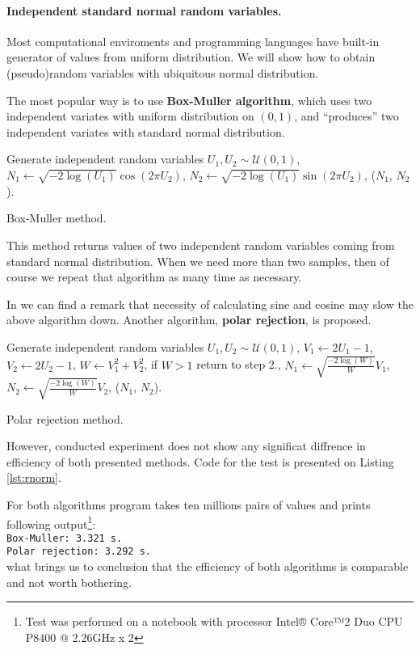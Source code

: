 \documentclass[a4paper,12pt, oneside]{book}
\theoremstyle{definition}
\theoremstyle{remark}
\begin{document}
\paragraph{Independent standard normal random variables.} Most computational enviroments and programming languages have built-in generator of values from uniform distribution. We will show how to obtain (pseudo)random variables with ubiquitous normal distribution.

The most popular way is to use \textbf{Box-Muller algorithm}, which uses two independent variates with uniform distribution on $(0,1)$, and ``produces'' two independent variates with standard normal distribution.
\begin{algorithm}[!ht]
 \begin{algorithmic}[1]
    \State Generate independent random variables $U_1, U_2 \sim \mathcal{U}(0,1)$,
    \State $N_1 \gets \sqrt{-2\log(U_1)} \cos(2\pi U_2)$,
    \State $N_2 \gets \sqrt{-2\log(U_1)} \sin(2\pi U_2)$,
    \State \Return ($N_1$, $N_2$).
  \EndFunction
 \end{algorithmic}
 \caption{Box-Muller method.}
 \label{alg:box-muller}
\end{algorithm}

This method returns values of two independent random variables coming from standard normal distribution. When we need more than two samples, then of course we repeat that algorithm as many time as necessary.

In \cite{london} we can find a remark that necessity of calculating sine and cosine may slow the above algorithm down. Another algorithm, \textbf{polar rejection}, is proposed.
\begin{algorithm}[!ht]
 \begin{algorithmic}[1]
    \State Generate independent random variables $U_1, U_2 \sim \mathcal{U}(0,1)$,
    \State $V_1 \gets 2U_1-1$,
    \State $V_2 \gets 2U_2-1$,
    \State $W \gets V_1^2 + V_2^2$,
    \State if $W > 1$ return to step 2.,
    \State $N_1 \gets \sqrt{\frac{-2\log(W)}{W}} V_1$,
    \State $N_2 \gets \sqrt{\frac{-2\log(W)}{W}} V_2$,
    \State \Return ($N_1$, $N_2$).
  \EndFunction
 \end{algorithmic}
 \caption{Polar rejection method.}
 \label{alg:polarRejection}
\end{algorithm}

However, conducted experiment does not show any significat diffrence in efficiency of both presented methods. Code for the test is presented on Listing \ref{lst:rnorm}.
\lstset{  basicstyle=\scriptsize }

For both algorithms program takes ten millions pairs of values and prints following \hbox{output}\footnote{Test was performed on a notebook with processor Intel® Core™2 Duo CPU P8400 @ 2.26GHz x 2 }: \bigskip \\
\texttt{Box-Muller: 3.321 s.\\
Polar rejection: 3.292 s.} \bigskip\\
what brings us to conclusion that the efficiency of both algorithms is comparable and not worth bothering.
\end{document}
